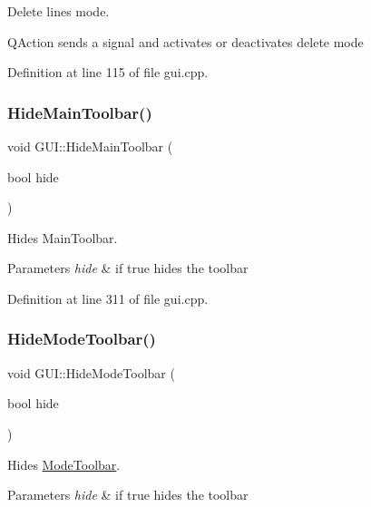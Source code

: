 Delete lines mode. 

Q\+Action sends a signal and activates or deactivates delete mode 

Definition at line 115 of file gui.\+cpp.

\mbox{\label{classGUI_aa115b0163bfbf518dd201f4f02476b75}} 
\subsubsection{\texorpdfstring{Hide\+Main\+Toolbar()}{HideMainToolbar()}}
{\footnotesize\ttfamily void G\+U\+I\+::\+Hide\+Main\+Toolbar (\begin{DoxyParamCaption}\item[{bool}]{hide }\end{DoxyParamCaption})}



Hides Main\+Toolbar. 


\begin{DoxyParams}{Parameters}
{\em hide} & if true hides the toolbar \\
\hline
\end{DoxyParams}


Definition at line 311 of file gui.\+cpp.

\mbox{\label{classGUI_a9517c0ad1e4c2b39faab8050f8133151}} 
\subsubsection{\texorpdfstring{Hide\+Mode\+Toolbar()}{HideModeToolbar()}}
{\footnotesize\ttfamily void G\+U\+I\+::\+Hide\+Mode\+Toolbar (\begin{DoxyParamCaption}\item[{bool}]{hide }\end{DoxyParamCaption})}



Hides \mbox{\hyperlink{structModeToolbar}{Mode\+Toolbar}}. 


\begin{DoxyParams}{Parameters}
{\em hide} & if true hides the toolbar \\
\hline
\end{DoxyParams}


